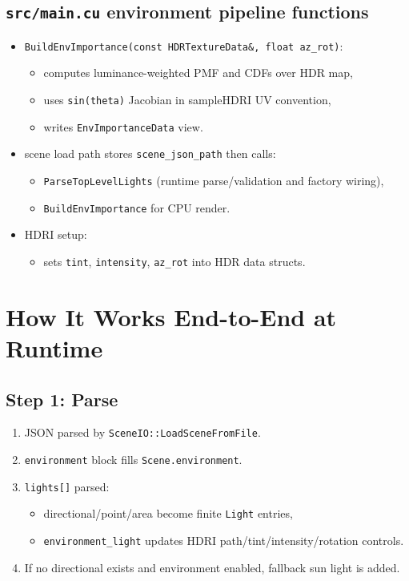 \documentclass[11pt]{article}
\begin{document}
\subsection{\texttt{src/main.cu} environment pipeline functions}
\begin{itemize}[leftmargin=1.5em]
  \item \verb|BuildEnvImportance(const HDRTextureData&, float az_rot)|:
  \begin{itemize}
    \item computes luminance-weighted PMF and CDFs over HDR map,
    \item uses \verb|sin(theta)| Jacobian in sampleHDRI UV convention,
    \item writes \verb|EnvImportanceData| view.
  \end{itemize}
  \item scene load path stores \verb|scene_json_path| then calls:
  \begin{itemize}
    \item \verb|ParseTopLevelLights| (runtime parse/validation and factory wiring),
    \item \verb|BuildEnvImportance| for CPU render.
  \end{itemize}
  \item HDRI setup:
  \begin{itemize}
    \item sets \verb|tint|, \verb|intensity|, \verb|az_rot| into HDR data structs.
  \end{itemize}
\end{itemize}

\section{How It Works End-to-End at Runtime}
\subsection{Step 1: Parse}
\begin{enumerate}[leftmargin=1.5em]
  \item JSON parsed by \verb|SceneIO::LoadSceneFromFile|.
  \item \verb|environment| block fills \verb|Scene.environment|.
  \item \verb|lights[]| parsed:
  \begin{itemize}
    \item directional/point/area become finite \verb|Light| entries,
    \item \verb|environment_light| updates HDRI path/tint/intensity/rotation controls.
  \end{itemize}
  \item If no directional exists and environment enabled, fallback sun light is added.
\end{enumerate}
\end{document}
